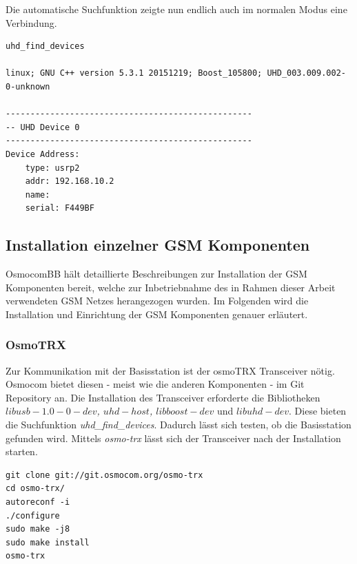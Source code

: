 Die automatische Suchfunktion zeigte nun endlich auch im normalen Modus eine Verbindung.
\begin{lstlisting}
uhd_find_devices

linux; GNU C++ version 5.3.1 20151219; Boost_105800; UHD_003.009.002-0-unknown

--------------------------------------------------
-- UHD Device 0
--------------------------------------------------
Device Address:
    type: usrp2
    addr: 192.168.10.2
    name: 
    serial: F449BF
\end{lstlisting}

\subsection{Installation einzelner GSM Komponenten}\label{GSM_Komp_Osmocom}
OsmocomBB hält detaillierte Beschreibungen zur Installation der GSM Komponenten bereit, welche zur Inbetriebnahme des in Rahmen dieser Arbeit verwendeten GSM Netzes herangezogen wurden. Im Folgenden wird die Installation und Einrichtung der GSM Komponenten genauer erläutert. 

\subsubsection{OsmoTRX}
Zur Kommunikation mit der Basisstation ist der osmoTRX Transceiver nötig. Osmocom bietet diesen - meist wie die anderen Komponenten - im Git Repository an. Die Installation des Transceiver erforderte die Bibliotheken \textit{$libusb-1.0-0-dev$, $uhd-host$, $libboost-dev$} und \textit{$libuhd-dev$}. Diese bieten die Suchfunktion \textit{uhd\_find\_devices}. Dadurch lässt sich testen, ob die Basisstation gefunden wird. Mittels \textit{osmo-trx} lässt sich der Transceiver nach der Installation starten.

\begin{lstlisting}
git clone git://git.osmocom.org/osmo-trx
cd osmo-trx/
autoreconf -i
./configure
sudo make -j8
sudo make install
osmo-trx	
\end{lstlisting}

